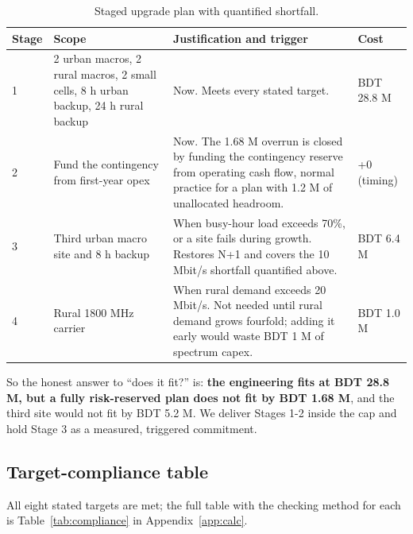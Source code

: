 \documentclass[9pt,a4paper]{article}
\begin{document}
\begin{table}[H]\centering\small
\caption{Staged upgrade plan with quantified shortfall.}
\label{tab:stages}
\begin{tabularx}{\textwidth}{@{}p{0.75cm}p{4.7cm}Xp{1.85cm}@{}}
\toprule
\textbf{Stage} & \textbf{Scope} & \textbf{Justification and trigger} & \textbf{Cost} \\
\midrule
1 & 2 urban macros, 2 rural macros, 2 small cells, 8 h urban backup, 24 h rural backup & Now. Meets every stated target. & BDT 28.8 M \\
2 & Fund the contingency from first-year opex & Now. The 1.68 M overrun is closed by funding the contingency reserve from operating cash flow, normal practice for a plan with 1.2 M of unallocated headroom. & +0 (timing) \\
3 & Third urban macro site and 8 h backup & When busy-hour load exceeds 70\%, or a site fails during growth. Restores N+1 and covers the 10 Mbit/s shortfall quantified above. & BDT 6.4 M \\
4 & Rural 1800 MHz carrier & When rural demand exceeds 20 Mbit/s. Not needed until rural demand grows fourfold; adding it early would waste BDT 1 M of spectrum capex. & BDT 1.0 M \\
\bottomrule
\end{tabularx}
\end{table}

So the honest answer to ``does it fit?'' is: \textbf{the engineering fits at BDT 28.8 M, but a
fully risk-reserved plan does not fit by BDT 1.68 M}, and the third site would not fit by BDT
5.2 M. We deliver Stages 1-2 inside the cap and hold Stage 3 as a measured, triggered commitment.

\subsection{Target-compliance table}
All eight stated targets are met; the full table with the checking method for each is
Table~\ref{tab:compliance} in Appendix~\ref{app:calc}.
\end{document}
